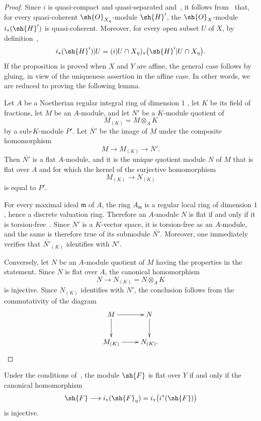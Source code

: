 \begin{proof}
Since $i$ is quasi-compact and quasi-separated
 and~, it follows
from~ that, for every quasi-coherent
$\sh{O}_{X_\eta}$-module $\sh{H}'$, the $\sh{O}_X$-module
$i_*(\sh{H}')$ is quasi-coherent. Moreover, for every open subset
$U$ of $X$, by definition~,
\[
  i_*(\sh{H}')|U
    =
  (i|U\cap X_\eta)_*
    \bigl(\sh{H}'|U\cap X_\eta\bigr).
\]
If the proposition is proved when $X$ and $Y$ are affine, the general
case follows by gluing, in view of the uniqueness assertion in the
affine case. In other words, we are reduced to proving the following
lemma.

\begin{lemma}[2.8.1.1]
\label{IV.2.8.1.1}
Let $A$ be a Noetherian regular integral ring of dimension $1$
, let $K$ be its field of fractions, let $M$ be an
$A$-module, and let $N'$ be a $K$-module quotient of
\[
  M_{(K)}=M\otimes_A K
\]
by a sub-$K$-module $P'$. Let $\overline{N'}$ be the image of $M$
under the composite homomorphism
\[
  M\longrightarrow M_{(K)}\longrightarrow N'.
\]
Then $\overline{N'}$ is a flat $A$-module, and it is the unique
quotient module $N$ of $M$ that is flat over $A$ and for which the
kernel of the surjective homomorphism
\[
  M_{(K)}\longrightarrow N_{(K)}
\]
is equal to $P'$.
\end{lemma}

For every maximal ideal $\mathfrak{m}$ of $A$, the ring
$A_\mathfrak{m}$ is a regular local ring of dimension $1$, hence a
discrete valuation ring. Therefore an $A$-module $N$ is flat if and
only if it is torsion-free~. Since $N'$ is a
$K$-vector space, it is torsion-free as an $A$-module, and the same is
therefore true of its submodule $\overline{N'}$. Moreover, one
immediately verifies that $\overline{N'}_{(K)}$ identifies with $N'$.

Conversely, let $N$ be an $A$-module quotient of $M$ having the
properties in the statement. Since $N$ is flat over $A$, the
canonical homomorphism
\[
  N\longrightarrow N_{(K)}=N\otimes_A K
\]
is injective. Since $N_{(K)}$ identifies with $N'$, the conclusion
follows from the commutativity of the diagram
\[
\xymatrix{
  M \ar[r] \ar[d] & N \ar[d] \\
  M_{(K)} \ar[r] & N_{(K)}.
}
\]
\end{proof}

\begin{corollary}[2.8.2]
\label{IV.2.8.2}
Under the conditions of~, the module $\sh{F}$ is flat
over $Y$ if and only if the canonical homomorphism
\[
  \sh{F}\longrightarrow i_*(\sh{F}_\eta)
    =i_*\bigl(i^*(\sh{F})\bigr)
\]
is injective.
\end{corollary}

